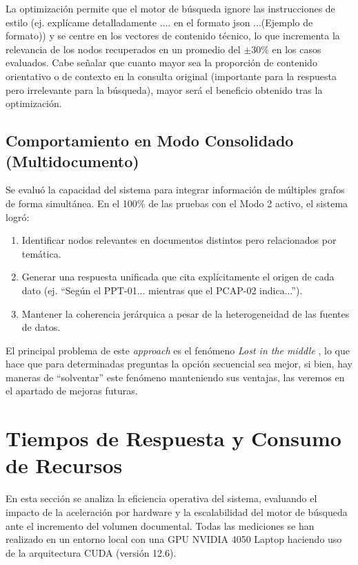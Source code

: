 La optimización permite que el motor de búsqueda ignore las instrucciones de estilo (ej. explícame detalladamente .... en el formato json ...(Ejemplo de formato)) y se centre en los vectores de contenido técnico, lo que incrementa la relevancia de los nodos recuperados en un promedio del $\pm30\%$ en los casos evaluados. Cabe señalar que cuanto mayor sea la proporción de contenido orientativo o de contexto en la consulta original (importante para la respuesta pero irrelevante para la búsqueda), mayor será el beneficio obtenido tras la optimización.

\subsection{Comportamiento en Modo Consolidado (Multidocumento)}
Se evaluó la capacidad del sistema para integrar información de múltiples grafos de forma simultánea. En el 100\% de las pruebas con el Modo 2 activo, el sistema logró:

\begin{enumerate}
    \item Identificar nodos relevantes en documentos distintos pero relacionados por temática.
    \item Generar una respuesta unificada que cita explícitamente el origen de cada dato (ej. ``Según el PPT-01... mientras que el PCAP-02 indica...'').
    \item Mantener la coherencia jerárquica a pesar de la heterogeneidad de las fuentes de datos.
\end{enumerate}

El principal problema de este \textit{approach} es el fenómeno \textit{Lost in the middle} \cite{liu2024lost}, lo que hace que para determinadas preguntas la opción secuencial sea mejor, si bien, hay maneras de ``solventar'' este fenómeno manteniendo sus ventajas, las veremos en el apartado de mejoras futuras.

\section{Tiempos de Respuesta y Consumo de Recursos}

En esta sección se analiza la eficiencia operativa del sistema, evaluando el impacto de la aceleración por hardware y la escalabilidad del motor de búsqueda ante el incremento del volumen documental. Todas las mediciones se han realizado en un entorno local con una GPU NVIDIA 4050 Laptop haciendo uso de la arquitectura CUDA (versión 12.6).


